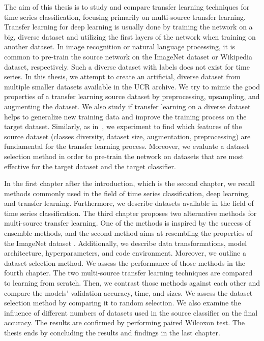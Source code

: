\documentclass[a4paper,11pt,twoside]{report}
\theoremstyle{definition}
\begin{document}
The aim of this thesis is to study and compare transfer learning techniques for time series classification, focusing primarily on multi-source transfer learning. Transfer learning for deep learning is usually done by training the network on a big, diverse dataset and utilizing the first layers of the network when training on another dataset. In image recognition or natural language processing, it is common to pre-train the source network on the ImageNet dataset or Wikipedia dataset, respectively. Such a diverse dataset with labels does not exist for time series. In this thesis, we attempt to create an artificial, diverse dataset from multiple smaller datasets available in the UCR archive. We try to mimic the good properties of a transfer learning source dataset by preprocessing, upsampling, and augmenting the dataset. We also study if transfer learning on a diverse dataset helps to generalize new training data and improve the training process on the target dataset. Similarly, as in~\cite{imagnet}, we experiment to find which features of the source dataset (classes diversity, dataset size, augmentation, preprocessing) are fundamental for the transfer learning process. Moreover, we evaluate a dataset selection method in order to pre-train the network on datasets that are most effective for the target dataset and the target classifier.

In the first chapter after the introduction, which is the second chapter, we recall methods commonly used in the field of time series classification, deep learning, and transfer learning. Furthermore, we describe datasets available in the field of time series classification. The third chapter proposes two alternative methods for multi-source transfer learning. One of the methods is inspired by the success of ensemble methods, and the second method aims at resembling the properties of the ImageNet dataset \cite{imagnet}. Additionally, we describe data transformations, model architecture, hyperparameters, and code environment. Moreover, we outline a dataset selection method. We assess the performance of those methods in the fourth chapter. The two multi-source transfer learning techniques are compared to learning from scratch. Then, we contrast those methods against each other and compare the models' validation accuracy, time, and sizes. We assess the dataset selection method by comparing it to random selection. We also examine the influence of different numbers of datasets used in the source classifier on the final accuracy. The results are confirmed by performing paired Wilcoxon test. The thesis ends by concluding the results and findings in the last chapter.
\end{document}
